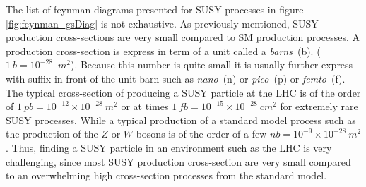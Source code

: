 {The list of feynman diagrams presented for SUSY processes in figure \ref{fig:feynman_gsDiag} is not exhaustive. As previously mentioned, SUSY production cross-sections are very small compared to SM production processes. A production cross-section is express in term of a unit called a \textit{barns}~(b). ($1~b = 10^{-28}$~$m^{2}$). Because this number is quite small it is usually further express with suffix in front of the unit barn such as \textit{nano}~(n) or \textit{pico}~(p) or \textit{femto}~(f). The typical cross-section of producing a SUSY particle at the LHC is of the order of $1~pb =10^{-12}\times 10^{-28}~m^{2}$ or at times $1~fb = 10^{-15}\times 10^{-28}~cm^{2}$ for extremely rare SUSY processes. While a typical production of a standard model process such as the production of the $Z$ or $W$ bosons is of the order of a few $nb = 10^{-9}\times 10^{-28}~m^{2}$. Thus, finding a SUSY particle in an environment such as the LHC is very challenging, since most SUSY production cross-section are very small compared to an overwhelming high cross-section processes from the standard model.


}
